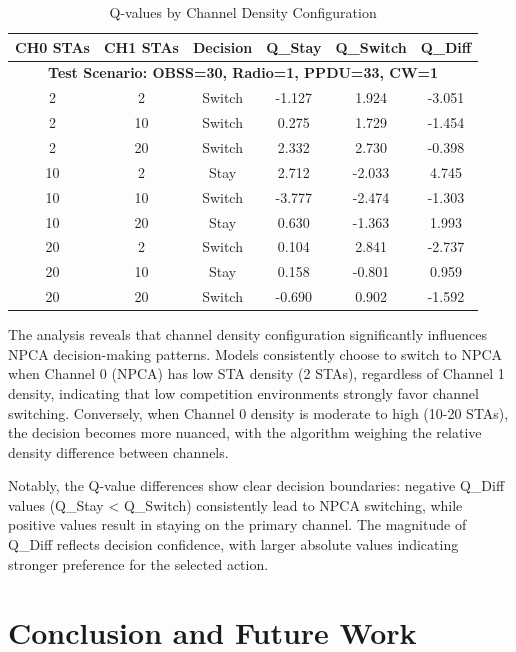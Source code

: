 \documentclass[conference]{IEEEtran}
\begin{document}
\begin{table}[htbp]
\caption{Q-values by Channel Density Configuration}
\begin{center}
\begin{tabular}{|c|c|c|c|c|c|}
\hline
\textbf{CH0 STAs} & \textbf{CH1 STAs} & \textbf{Decision} & \textbf{Q\_Stay} & \textbf{Q\_Switch} & \textbf{Q\_Diff} \\
\hline
\multicolumn{6}{|c|}{\textbf{Test Scenario: OBSS=30, Radio=1, PPDU=33, CW=1}} \\
\hline
2 & 2 & Switch & -1.127 & 1.924 & -3.051 \\
2 & 10 & Switch & 0.275 & 1.729 & -1.454 \\
2 & 20 & Switch & 2.332 & 2.730 & -0.398 \\
10 & 2 & Stay & 2.712 & -2.033 & 4.745 \\
10 & 10 & Switch & -3.777 & -2.474 & -1.303 \\
10 & 20 & Stay & 0.630 & -1.363 & 1.993 \\
20 & 2 & Switch & 0.104 & 2.841 & -2.737 \\
20 & 10 & Stay & 0.158 & -0.801 & 0.959 \\
20 & 20 & Switch & -0.690 & 0.902 & -1.592 \\
\hline
\end{tabular}
\label{tab:density_qvalues}
\end{center}
\end{table}

The analysis reveals that channel density configuration significantly influences NPCA decision-making patterns. Models consistently choose to switch to NPCA when Channel 0 (NPCA) has low STA density (2 STAs), regardless of Channel 1 density, indicating that low competition environments strongly favor channel switching. Conversely, when Channel 0 density is moderate to high (10-20 STAs), the decision becomes more nuanced, with the algorithm weighing the relative density difference between channels.

Notably, the Q-value differences show clear decision boundaries: negative Q\_Diff values (Q\_Stay < Q\_Switch) consistently lead to NPCA switching, while positive values result in staying on the primary channel. The magnitude of Q\_Diff reflects decision confidence, with larger absolute values indicating stronger preference for the selected action.

\section{Conclusion and Future Work}
\end{document}
